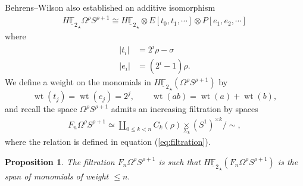 \documentclass[]{amsart}  %
\newtheorem{proposition}[equation]{Proposition}
\theoremstyle{definition}
\numberwithin{equation}{section}
\numberwithin{figure}{section}
\DeclareMathOperator{\wt}{wt}
\newcommand{\mF}{{\mathbb F}}
\newcommand{\umF}{\underline{\mF}}
\newcommand{\0}{\langle 0 \rangle}
\begin{document}
Behrens--Wilson \cite{BW2018} also established an additive isomorphism
	\begin{align} \label{eq:hOmega2S3}
		H {\umF_2}_\star \Omega^\rho S^{\rho + 1} \cong H {\umF_2}_\star \otimes E [t_0, t_1, \cdots ] \otimes P [ e_1, e_2, \cdots ] 
	\end{align}
	where
	\begin{align*}
		\vert t_i \vert & = 2^i \rho - \sigma \\
		\vert e_i \vert & = (2^i - 1) \rho.
	\end{align*}
We define a weight on the monomials in $H {\umF_2}_\star (\Omega^\rho S^{\rho + 1})$ by 
	$$\wt(t_j) = \wt(e_j) = 2^j, \qquad \wt(ab) = \wt(a) + \wt(b), $$
and recall the space $\Omega^\rho S^{\rho + 1}$ admits an increasing filtration by spaces
\begin{align*}
   F_n \Omega^\rho S^{\rho + 1} \simeq \underset{0 \leq k < n}{\displaystyle{\coprod}} C_k(\rho) \underset{\Sigma_k}{\times} (S^1)^{\times k} / \sim, 
\end{align*}
where the relation is defined in equation (\ref{eq:filtration}).

\begin{proposition}
    The filtration $F_n \Omega^\rho S^{\rho + 1}$ is such that $H {\umF_2}_\star (F_n \Omega^\rho S^{\rho + 1} )$ is the span of monomials of weight $\leq n.$
\end{proposition}
\end{document}
